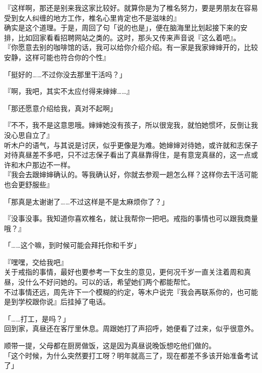 『这样啊，那还是别来我这家比较好。就算你是为了椎名努力，要是男朋友在容易受到女人纠缠的地方工作，椎名心里肯定也不是滋味的』\\

确实是这个道理。于是，周回了句「说的也是」，便在脑海里比划起接下来的安排，比如回家看看招聘网站之类的。这时，那头又传来声音说『这么着吧』。\\

『你愿意去别的咖啡馆的话，我可以给你介绍介绍。有一家是我家婶婶开的，比较安静，这样可能也符合你的个性』

「挺好的……不过你没去那里干活吗？」

『啊，我吧，其实不太应付得来婶婶……』

「那还愿意介绍给我，真对不起啊」

『不不，我不是这意思哦。婶婶她没有孩子，所以很宠我，就怕她惯坏，反倒让我没心思自立了』\\

听木户的语气，与其说是讨厌，似乎更像是为难。她婶婶对待她，或许就和志保子对待真昼差不多吧，只不过志保子看出了真昼靠得住，是有意宠真昼的，这一点或许和木户那边不一样。\\

『我会去跟婶婶确认的。等我确认好，你就去参观一趟怎么样？这样你去干活可能也会更舒服些』

「那真是太谢谢了……不过这样是不是太麻烦你了？」

『没事没事。我知道你喜欢椎名，就让我帮你一把吧。戒指的事情也可以跟我商量哦？』

「……这个嘛，到时候可能会拜托你和千岁」

『嘿嘿，交给我吧』\\

关于戒指的事情，最好也要参考一下女生的意见，更何况千岁一直关注着周和真昼，没什么不好问她的。可以的话，希望她们两个都能帮忙。\\

不过事情还远，周先许下一个模糊的约定，等木户说完『我会再联系你的，也可能是到学校跟你说』后挂掉了电话。\\

\vspace{2\baselineskip}

「……打工，是吗？」\\

回到家，真昼还在客厅里休息。周跟她打了声招呼，她便看了过来，似乎很意外。

顺带一提，父母都在厨房做饭，这是因为真昼说晚饭想吃他们做的。\\

「这个时候，为什么突然要打工呀？明年就高三了，现在都差不多该开始准备考试了」\\

